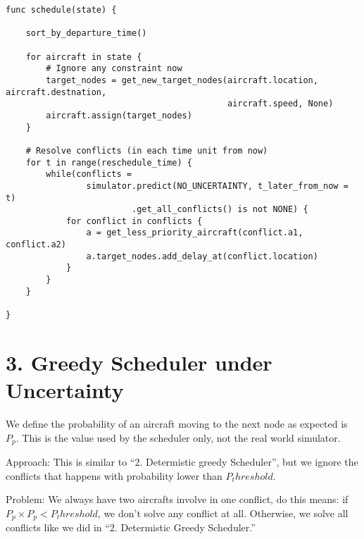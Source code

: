 \documentclass[]{article} \usepackage[margin=0.6in]{geometry} \setlength{\columnsep}{0.2in} \pagenumbering{gobble}
\begin{document}
\begin{verbatim}
func schedule(state) {

    sort_by_departure_time()

    for aircraft in state {
        # Ignore any constraint now
        target_nodes = get_new_target_nodes(aircraft.location, aircraft.destnation,
                                            aircraft.speed, None)
        aircraft.assign(target_nodes)
    }

    # Resolve conflicts (in each time unit from now)
    for t in range(reschedule_time) {
        while(conflicts = 
                simulator.predict(NO_UNCERTAINTY, t_later_from_now = t)
                         .get_all_conflicts() is not NONE) {
            for conflict in conflicts {
                a = get_less_priority_aircraft(conflict.a1, conflict.a2)
                a.target_nodes.add_delay_at(conflict.location)
            }
        }
    }

}
\end{verbatim}

\section{3. Greedy Scheduler under
Uncertainty}\label{greedy-scheduler-under-uncertainty}

We define the probability of an aircraft moving to the next node as
expected is \(P_p\). This is the value used by the scheduler only, not
the real world simulator.

Approach: This is similar to ``2. Determistic greedy Scheduler'', but we
ignore the conflicts that happens with probability lower than
\(P_threshold\).

Problem: We always have two aircrafts involve in one conflict, do this
means: if \(P_p \times P_p < P_threshold\), we don't solve any conflict
at all. Otherwise, we solve all conflicts like we did in ``2.
Determistic Greedy Scheduler.''
\end{document}
